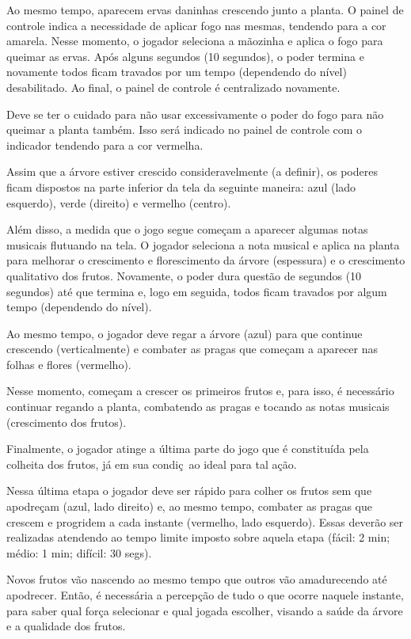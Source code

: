 \documentclass[12pt]{article}
\begin{document}
 Ao mesmo tempo, aparecem ervas daninhas crescendo junto a planta. O painel de controle indica
 a necessidade de aplicar fogo nas mesmas, tendendo para a cor amarela. Nesse momento, o jogador
 seleciona a m\~aozinha e aplica o fogo para queimar as ervas. Ap\'os alguns segundos (10 segundos),
 o poder termina e novamente todos ficam travados por um tempo (dependendo do n\'ivel) desabilitado.
 Ao final, o painel de controle \'e centralizado novamente.
 
 Deve se ter o cuidado para n\~ao usar excessivamente o poder do fogo para n\~ao queimar a planta tamb\'em.
 Isso ser\'a indicado no painel de controle com o indicador tendendo para a cor vermelha.
 
 Assim que a \'arvore estiver crescido consideravelmente (a definir), os poderes ficam dispostos na parte
 inferior da tela da seguinte maneira: azul (lado esquerdo), verde (direito) e vermelho (centro).

 Al\'em disso, a medida que o jogo segue come\c cam a aparecer algumas notas musicais flutuando na tela.
 O jogador seleciona a nota musical e aplica na planta para melhorar o crescimento e florescimento da \'arvore
 (espessura) e o crescimento qualitativo dos frutos. Novamente, o poder dura quest\~ao de segundos
 (10 segundos) at\'e que termina e, logo em seguida, todos ficam travados por algum tempo (dependendo do n\'ivel).

 Ao mesmo tempo, o jogador deve regar a \'arvore (azul) para que continue crescendo (verticalmente) e combater
 as pragas que começam a aparecer nas folhas e flores (vermelho).
 
 Nesse momento, come\c cam a crescer os primeiros frutos e, para isso, \'e necess\'ario continuar regando
 a planta, combatendo as pragas e tocando as notas musicais (crescimento dos frutos).

 Finalmente, o jogador atinge a \'ultima parte do jogo que \'e constituída pela colheita dos frutos,
 j\'a em sua condi\c c~ao ideal para tal a\c c\~ao.

 Nessa \'ultima etapa o jogador deve ser r\'apido para colher os frutos sem que apodre\c cam (azul, lado direito)
 e, ao mesmo tempo, combater as pragas que crescem e progridem a cada instante (vermelho, lado esquerdo).
 Essas dever\~ao ser realizadas atendendo ao tempo limite imposto sobre aquela etapa (f\'acil: 2 min; m\'edio:
 1 min; difícil: 30 segs).
 
 Novos frutos v\~ao nascendo ao mesmo tempo que outros v\~ao amadurecendo at\'e apodrecer. Ent\~ao, \'e
 necess\'aria a percep\c c\~ao de tudo o que ocorre naquele instante, para saber qual for\c ca selecionar
 e qual jogada escolher, visando a sa\'ude da \'arvore e a qualidade dos frutos.
 
\end{document}
